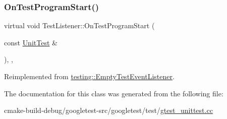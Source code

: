 \subsubsection{\texorpdfstring{OnTestProgramStart()}{OnTestProgramStart()}}
{\footnotesize\ttfamily virtual void Test\+Listener\+::\+On\+Test\+Program\+Start (\begin{DoxyParamCaption}\item[{const \mbox{\hyperlink{classtesting_1_1UnitTest}{Unit\+Test}} \&}]{ }\end{DoxyParamCaption})\hspace{0.3cm}{\ttfamily [inline]}, {\ttfamily [protected]}, {\ttfamily [virtual]}}



Reimplemented from \mbox{\hyperlink{classtesting_1_1EmptyTestEventListener_aa3847c8a3c22d8d69a6006dfdd6589fc}{testing\+::\+Empty\+Test\+Event\+Listener}}.



The documentation for this class was generated from the following file\+:\begin{DoxyCompactItemize}
\item 
cmake-\/build-\/debug/googletest-\/src/googletest/test/\mbox{\hyperlink{gtest__unittest_8cc}{gtest\+\_\+unittest.\+cc}}\end{DoxyCompactItemize}
